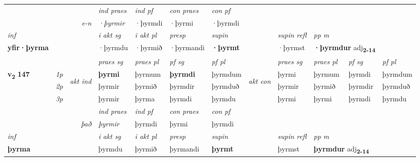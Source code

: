 \begin{longtable}[l]{X>{\footnotesize\itshape}llXXXXlXXXX}
   && &  \textit{ind praes} & \textit{ind pf} & \textit{con praes} & \textit{con pf} \\*
\multicolumn{3}{r}{\textit{e-n}} & ·þyrmir & ·þyrmdi & ·þyrmi & ·þyrmdi \\*

\cmidrule{4-7}
   {\textit{inf}} & &  & \textit{i akt sg} & \textit{i akt pl}   & \textit{presp} & \textit{supin} && \textit{supin refl} & \textit{pp m} \\*
  {\textbf{yfir\allowbreak ·þyrma}} & && ·þyrmdu  & ·þyrmið   & ·þyrmandi &  \textbf{·þyrmt} && ·þyrmst & \multicolumn{2}{l}{\textbf{·þyrmdur} adj\textbf{\textsubscript{2-14}}} \\*

\midrule

 & &   & \textit{praes sg}  & \textit{praes pl}    & \textit{ pf sg} & \textit{pf pl} & & \textit{praes sg}  & \textit{praes pl}    & \textit{pf sg} & \textit{pf pl }  \\ \cmidrule{4-7} \cmidrule{9-12}
 \multirow{2}{*}{{{\textbf{v{\textsubscript{2}}} \Large{\textbf{147}}}}}  & 1p & \multirow{3}{*}{\begin{turn}{90}\textit{akt ind}\end{turn}} & \textbf{þyrmi} & þyrmum & \textbf{þyrmdi} & þyrmdum & \multirow{3}{*}{\begin{turn}{90}\textit{akt con}\end{turn}} &þyrmi & þyrmum & þyrmdi & þyrmdum\\*
 & 2p &  &  þyrmir  & þyrmið & þyrmdir & þyrmduð & & þyrmir & þyrmið & þyrmdir & þyrmduð \\*
 & 3p &  & þyrmir & þyrma & þyrmdi & þyrmdu & & þyrmi & þyrmi& þyrmdi & þyrmdu \\*
\cmidrule{4-7} \cmidrule{9-12}

   && &  \textit{ind praes} & \textit{ind pf} & \textit{con praes} & \textit{con pf} \\*
\multicolumn{3}{r}{\textit{það}} & þyrmir & þyrmdi & þyrmi & þyrmdi \\*

\cmidrule{4-7}
   {\textit{inf}} & &  & \textit{i akt sg} & \textit{i akt pl}   & \textit{presp} & \textit{supin} && \textit{supin refl} & \textit{pp m} \\*
  {\textbf{þyrma}} & && þyrmdu  & þyrmið   & þyrmandi &  \textbf{þyrmt} && þyrmst & \multicolumn{2}{l}{\textbf{þyrmdur} adj\textbf{\textsubscript{2-14}}} \\*

\midrule


\end{longtable}
